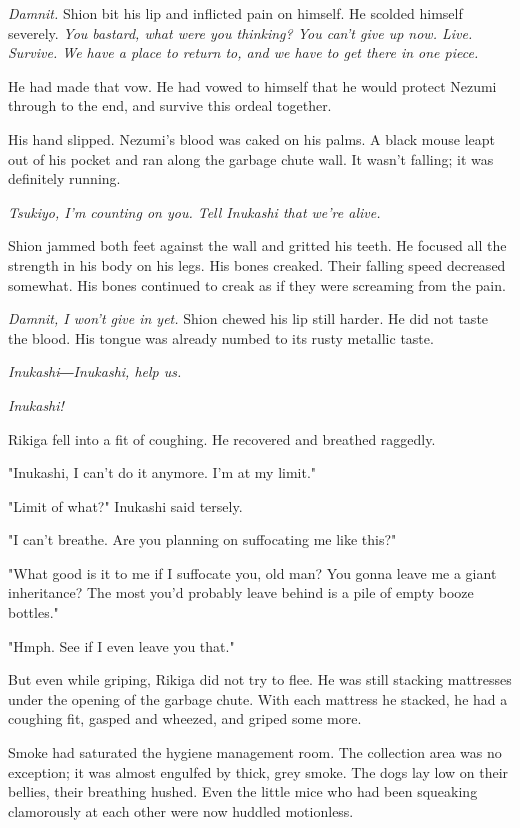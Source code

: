 \emph{Damnit.} Shion bit his lip and inflicted pain on himself. He scolded
himself severely. \emph{You bastard, what were you thinking? You can't give up
now. Live. Survive. We have a place to return to, and we have to get
there in one piece.}

He had made that vow. He had vowed to himself that he would protect
Nezumi through to the end, and survive this ordeal together.

His hand slipped. Nezumi's blood was caked on his palms. A black mouse
leapt out of his pocket and ran along the garbage chute wall. It wasn't
falling; it was definitely running.

\emph{Tsukiyo, I'm counting on you. Tell Inukashi that we're alive.}

Shion jammed both feet against the wall and gritted his teeth. He
focused all the strength in his body on his legs. His bones creaked.
Their falling speed decreased somewhat. His bones continued to creak as
if they were screaming from the pain.

\emph{Damnit, I won't give in yet.} Shion chewed his lip still harder. He did
not taste the blood. His tongue was already numbed to its rusty metallic
taste.

\emph{Inukashi―Inukashi, help us.}

\emph{Inukashi!}

\myspace

Rikiga fell into a fit of coughing. He recovered and breathed raggedly.

"Inukashi, I can't do it anymore. I'm at my limit."

"Limit of what?" Inukashi said tersely.

"I can't breathe. Are you planning on suffocating me like this?"

"What good is it to me if I suffocate you, old man? You gonna leave me a
giant inheritance? The most you'd probably leave behind is a pile of
empty booze bottles."

"Hmph. See if I even leave you that."

But even while griping, Rikiga did not try to flee. He was still
stacking mattresses under the opening of the garbage chute. With each
mattress he stacked, he had a coughing fit, gasped and wheezed, and
griped some more.

Smoke had saturated the hygiene management room. The collection area was
no exception; it was almost engulfed by thick, grey smoke. The dogs lay
low on their bellies, their breathing hushed. Even the little mice who
had been squeaking clamorously at each other were now huddled
motionless.

